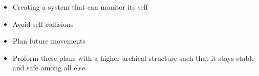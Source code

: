 



\begin{itemize}
\item Creating a system that can monitor its self
\item Avoid self collisions
\item Plan future movements
\item Proform these plans with a higher archical structure such that it stays stable and safe among all else.
\end{itemize}
